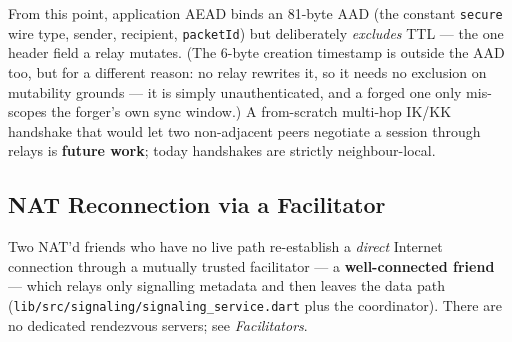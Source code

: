 \documentclass[11pt]{report}
\newcommand{\code}[1]{\texttt{\small #1}}
\begin{document}
From this point, application AEAD binds an 81-byte AAD (the constant
\code{secure} wire type, sender, recipient, \code{packetId}) but deliberately
\emph{excludes} TTL --- the one header field a relay mutates. (The 6-byte
creation timestamp is outside the AAD too, but for a different reason: no relay
rewrites it, so it needs no exclusion on mutability grounds --- it is simply
unauthenticated, and a forged one only mis-scopes the forger's own sync
window.) A from-scratch
multi-hop IK/KK handshake that would let two non-adjacent peers negotiate a
session through relays is \textbf{future work}; today handshakes are strictly
neighbour-local.

\subsection{NAT Reconnection via a Facilitator}

Two NAT'd friends who have no live path re-establish a \emph{direct} Internet
connection through a mutually trusted facilitator --- a \textbf{well-connected
friend} --- which relays only signalling metadata and
then leaves the data path (\code{lib/src/signaling/signaling\_service.dart} plus
the coordinator). There are no dedicated rendezvous servers; see
\emph{Facilitators}.
\end{document}
